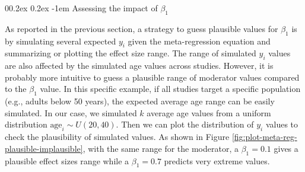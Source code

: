 \documentclass[
  man,floatsintext]{apa6}
\makeatletter
\let\oldparagraph\paragraph
\renewcommand{\paragraph}[1]{\oldparagraph{#1}\mbox{}}
\renewcommand{\paragraph}{\@startsection{paragraph}{4}{\parindent}%
  {0\baselineskip \@plus 0.2ex \@minus 0.2ex}%
  {-1em}%
  {\normalfont\normalsize\bfseries\itshape\typesectitle}}
\makeatother
\begin{document}
\hypertarget{assessing-the-impact-of-beta_1}{%
\paragraph{\texorpdfstring{Assessing the impact of \(\beta_1\)}{Assessing the impact of \textbackslash beta\_1}}\label{assessing-the-impact-of-beta_1}}

As reported in the previous section, a strategy to guess plausible values for \(\beta_{1}\) is by simulating several expected \(y_{i}\) given the meta-regression equation and summarizing or plotting the effect size range. The range of simulated \(y_{i}\) values are also affected by the simulated age values across studies. However, it is probably more intuitive to guess a plausible range of moderator values compared to the \(\beta_{1}\) value. In this specific example, if all studies target a specific population (e.g., adults below 50 years), the expected average age range can be easily simulated. In our case, we simulated \(k\) average age values from a uniform distribution \(\text{age}_{i} \sim U\left( 20,40 \right)\). Then we can plot the distribution of \(y_{i}\) values to check the plausibility of simulated values. As shown in Figure \ref{fig:plot-meta-reg-plausible-implausible}, with the same range for the moderator, a \(\beta_{1} = 0.1\) gives a plausible effect sizes range while a \(\beta_{1} = 0.7\) predicts very extreme values.

\scriptsize
\end{document}
